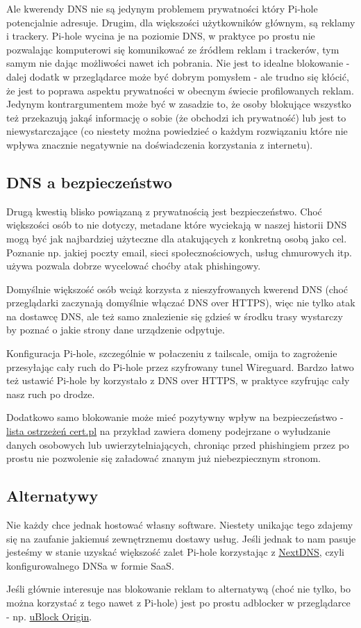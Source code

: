 \documentclass{report}
\numberwithin{equation}{section}
\begin{document}
Ale kwerendy DNS nie są jedynym problemem prywatności który Pi-hole potencjalnie adresuje. Drugim, dla większości użytkowników głównym, są reklamy i trackery. Pi-hole wycina je na poziomie DNS, w praktyce po prostu nie pozwalając komputerowi się komunikować ze źródłem reklam i trackerów, tym samym nie dając możliwości nawet ich pobrania. Nie jest to idealne blokowanie - dalej dodatk w przeglądarce może być dobrym pomysłem - ale trudno się kłócić, że jest to poprawa aspektu prywatności w obecnym świecie profilowanych reklam. Jedynym kontrargumentem może być w zasadzie to, że osoby blokujące wszystko też przekazują jakąś informację o sobie (że obchodzi ich prywatność) lub jest to niewystarczające (co niestety można powiedzieć o każdym rozwiązaniu które nie wpływa znacznie negatywnie na doświadczenia korzystania z internetu).

\subsection{DNS a bezpieczeństwo}

Drugą kwestią blisko powiązaną z prywatnością jest bezpieczeństwo. Choć większości osób to nie dotyczy, metadane które wyciekają w naszej historii DNS mogą być jak najbardziej użyteczne dla atakujących z konkretną osobą jako cel. Poznanie np. jakiej poczty email, sieci społecznościowych, usług chmurowych itp. używa pozwala dobrze wycelować choćby atak phishingowy.

Domyślnie większość osób wciąż korzysta z nieszyfrowanych kwerend DNS (choć przeglądarki zaczynają domyślnie włączać DNS over HTTPS), więc nie tylko atak na dostawcę DNS, ale też samo znalezienie się gdzieś w środku trasy wystarczy by poznać o jakie strony dane urządzenie odpytuje.

Konfiguracja Pi-hole, szczególnie w połaczeniu z tailscale, omija to zagrożenie przesyłając cały ruch do Pi-hole przez szyfrowany tunel Wireguard. Bardzo łatwo też ustawić Pi-hole by korzystało z DNS over HTTPS, w praktyce szyfrując cały nasz ruch po drodze.

Dodatkowo samo blokowanie może mieć pozytywny wpływ na bezpieczeństwo - \href{https://cert.pl/posts/2020/03/ostrzezenia_phishing/}{lista ostrzeżeń cert.pl} na przykład zawiera domeny podejrzane o wyłudzanie danych osobowych lub uwierzytelniających, chroniąc przed phishingiem przez po prostu nie pozwolenie się załadować znanym już niebezpiecznym stronom.

\subsection{Alternatywy}
Nie każdy chce jednak hostować własny software. Niestety unikając tego zdajemy się na zaufanie jakiemuś zewnętrznemu dostawy usług. Jeśli jednak to nam pasuje jesteśmy w stanie uzyskać większość zalet Pi-hole korzystając z \href{https://nextdns.io/}{NextDNS}, czyli konfigurowalnego DNSa w formie SaaS.

Jeśli głównie interesuje nas blokowanie reklam to alternatywą (choć nie tylko, bo można korzystać z tego nawet z Pi-hole) jest po prostu adblocker w przeglądarce - np. \href{https://github.com/gorhill/uBlock}{uBlock Origin}.
\end{document}
